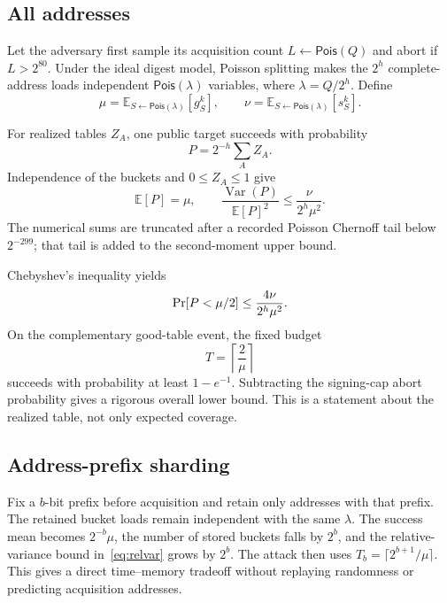 \documentclass[11pt,a4paper]{article}
\newcommand{\Prb}{\mathop{\rm Pr}}
\newcommand{\E}{\mathbb E}
\begin{document}
\subsection{All addresses}

Let the adversary first sample its acquisition count
$L\leftarrow\mathsf{Pois}(Q)$ and abort if $L>2^{80}$.  Under the ideal digest
model, Poisson splitting makes the $2^h$ complete-address loads independent
$\mathsf{Pois}(\lambda)$ variables, where $\lambda=Q/2^h$.  Define
\begin{equation}
 \mu=\E_{S\leftarrow\mathsf{Pois}(\lambda)}[g_S^k],\qquad
 \nu=\E_{S\leftarrow\mathsf{Pois}(\lambda)}[s_S^k].          \label{eq:munu}
\end{equation}

For realized tables $Z_A$, one public target succeeds with probability
\begin{equation}
                  P=2^{-h}\sum_A Z_A.                        \label{eq:P}
\end{equation}
Independence of the buckets and $0\leq Z_A\leq1$ give
\begin{equation}
 \E[P]=\mu,\qquad
 \frac{\operatorname{Var}(P)}{\E[P]^2}
       \leq \frac{\nu}{2^h\mu^2}.                            \label{eq:relvar}
\end{equation}
The numerical sums are truncated after a recorded Poisson Chernoff tail below
$2^{-299}$; that tail is added to the second-moment upper bound.

Chebyshev's inequality yields
\begin{equation}
 \Prb[P<\mu/2]\leq\frac{4\nu}{2^h\mu^2}.                    \label{eq:cheb}
\end{equation}
On the complementary good-table event, the fixed budget
\begin{equation}
                         T=\left\lceil\frac2\mu\right\rceil \label{eq:T}
\end{equation}
succeeds with probability at least $1-e^{-1}$.  Subtracting the signing-cap
abort probability gives a rigorous overall lower bound.  This is a statement
about the realized table, not only expected coverage.

\subsection{Address-prefix sharding}

Fix a $b$-bit prefix before acquisition and retain only addresses with that
prefix.  The retained bucket loads remain independent with the same
$\lambda$.  The success mean becomes $2^{-b}\mu$, the number of stored buckets
falls by $2^b$, and the relative-variance bound in~\eqref{eq:relvar} grows by
$2^b$.  The attack then uses
$T_b=\lceil 2^{b+1}/\mu\rceil$.  This gives a direct time--memory tradeoff
without replaying randomness or predicting acquisition addresses.
\end{document}
